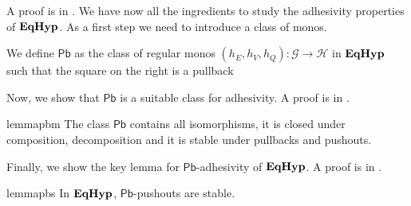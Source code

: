 \documentclass[a4paper,UKenglish,cleveref,pdftex,thm-restate,numberwithinsect]{lipics-v2021}
\newcommand{\pbc}{\mathsf{Pb}}
\newcommand{\catname}[1]{\textbf{\textup{#1}}}
\newcommand{\EqHyp}{\catname{EqHyp}} %
\begin{document}
A proof is in .
We have now all the ingredients to study the adhesivity properties of $\EqHyp$.  As a first step we need to introduce a class of monos.

\noindent
\parbox{11cm}{
\begin{definition}
	We define $\pbc$ as the class of  regular monos $(h_E, h_V, h_Q)\colon \mathcal{G}\to \mathcal{H}$ in $\EqHyp$ such that the square on the right is a pullback
\end{definition}
} \hfill
	\parbox{2cm}{
         }   

\vspace{.1cm}
Now, we show that $\pbc$ is a suitable class for adhesivity. A proof is in .

\begin{restatable}{lemma}{pbm}\label{lem:pbmono}
	The class $\pbc$ contains all isomorphisms, it is closed under composition, decomposition and it is stable under pullbacks and pushouts.
\end{restatable}

\vspace{.1cm}
Finally, we show the key lemma for $\pbc$-adhesivity of $\EqHyp$. A proof is in .

\begin{restatable}{lemma}{pbs}\label{lemma:stab}
	In $\EqHyp$, $\pbc$-pushouts are stable.
\end{restatable}
\end{document}
